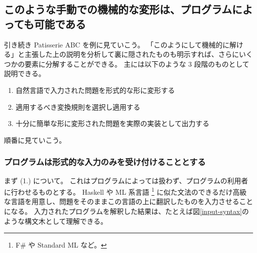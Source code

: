 \documentclass{ltjsarticle}
\begin{document}
\subsection{このような手動での機械的な変形は、プログラムによっても可能である}

引き続き Patisserie ABC を例に見ていこう。
「このようにして機械的に解ける」と主張した上の説明を分析して裏に隠されたものも明示すれば、さらにいくつかの要素に分解することができる。
主には以下のような $3$ 段階のものとして説明できる。

\begin{enumerate}[label=(\arabic{enumi}.)]
    \item 自然言語で入力された問題を形式的な形に変形する
    \item 適用するべき変換規則を選択し適用する
    \item 十分に簡単な形に変形された問題を実際の実装として出力する
\end{enumerate}

順番に見ていこう。

\subsubsection{プログラムは形式的な入力のみを受け付けることとする}

まず (1.) について。
これはプログラムによっては扱わず、プログラムの利用者に行わせるものとする。
Haskell や ML 系言語 \footnote{F\# や Standard ML など。} に似た文法のできるだけ高級な言語を用意し、問題をそのままこの言語の上に翻訳したものを入力させることになる。
入力されたプログラムを解釈した結果は、たとえば図\ref{input-syntax}のような構文木として理解できる。
\end{document}
